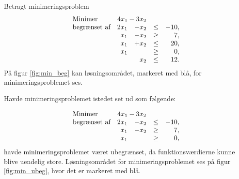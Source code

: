 \begin{eks}
Betragt minimeringsproblem
%
\begin{align*}
\begin{array}{lrrlr}
\text{Minimer}		&	\multicolumn{2}{c}{4x_1-3x_2}  &\\
\text{begrænset af}	&2x_1& - x_2			&\leq 	&-10,\\
					&x_1& - x_2				&\geq	& 7,\\
					&x_1& + x_2				&\leq	& 20,\\
					&x_1&					&\geq	& 0,\\
					& &x_2					&\leq	& 12.
\end{array}
\end{align*}
%
På figur \ref{fig:min_beg} kan løsningsområdet, markeret med blå, for minimeringsproblemet ses.
%

\noindent
% 
Havde minimeringsproblemet istedet set ud som følgende: 

\begin{align*}
\begin{array}{lrrlr}
\text{Minimer}		&	\multicolumn{2}{c}{4x_1-3x_2}  &\\
\text{begrænset af}	&2x_1& - x_2			&\leq 	&-10,\\
					&x_1& - x_2				&\geq	& 7,\\
					&x_1&					&\geq	& 0,
\end{array}
\end{align*}
havde minimeringsproblemet været ubegrænset, da funktionsværdierne kunne blive uendelig store. 
Løsningsområdet for minimeringsproblemet ses på figur \ref{fig:min_ubeg}, hvor det er markeret med blå.
%

%
\end{eks}